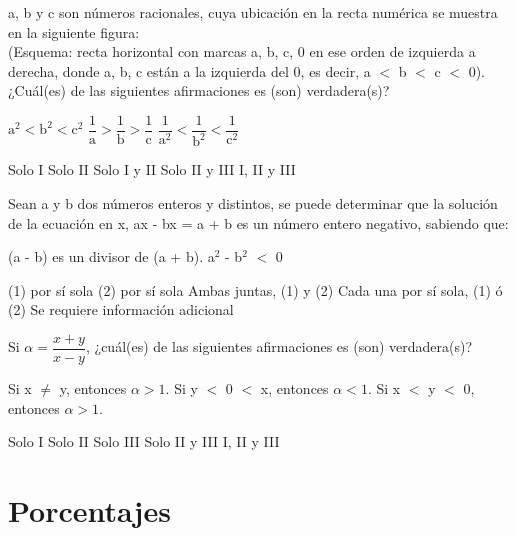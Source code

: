 \documentclass[pagina vacia]{srs}
\begin{document}
\begin{preguntas}[after-item-skip=1cm]
\pregunta a, b y c son números racionales, cuya ubicación en la recta numérica se muestra en la siguiente figura: \\ (Esquema: recta horizontal con marcas a, b, c, 0 en ese orden de izquierda a derecha, donde a, b, c están a la izquierda del 0, es decir, a \(<\) b \(<\) c \(<\) 0). \\ ¿Cuál(es) de las siguientes afirmaciones es (son) verdadera(s)?
\begin{verticali}
\alternativa \( \text{a}^2 < \text{b}^2 < \text{c}^2 \)
\alternativa \( \dfrac{1}{\text{a}} > \dfrac{1}{\text{b}} > \dfrac{1}{\text{c}} \)
\alternativa \( \dfrac{1}{\text{a}^2} < \dfrac{1}{\text{b}^2} < \dfrac{1}{\text{c}^2} \)
\end{verticali}
\begin{vertical}
\alternativa Solo I
\alternativa Solo II
\alternativa Solo I y II
\alternativa Solo II y III
\alternativa I, II y III
\end{vertical}

\pregunta Sean a y b dos números enteros y distintos, se puede determinar que la solución de la ecuación en x, ax - bx = a + b es un número entero negativo, sabiendo que:
\begin{verticaln}
\alternativa (a - b) es un divisor de (a + b).
\alternativa a\(^2\) - b\(^2\) \(<\) 0
\end{verticaln}
\begin{vertical}
\alternativa (1) por sí sola
\alternativa (2) por sí sola
\alternativa Ambas juntas, (1) y (2)
\alternativa Cada una por sí sola, (1) ó (2)
\alternativa Se requiere información adicional
\end{vertical}

\pregunta Si \( \alpha = \dfrac{x+y}{x-y} \), ¿cuál(es) de las siguientes afirmaciones es (son) verdadera(s)?
\begin{verticali}
\alternativa Si x \( \neq \) y, entonces \( \alpha > 1 \).
\alternativa Si y \(<\) 0 \(<\) x, entonces \( \alpha < 1 \).
\alternativa Si x \(<\) y \(<\) 0, entonces \( \alpha > 1 \).
\end{verticali}
\begin{vertical}
\alternativa Solo I
\alternativa Solo II
\alternativa Solo III
\alternativa Solo II y III
\alternativa I, II y III
\end{vertical}

\end{preguntas}

\section{Porcentajes}
\end{document}
